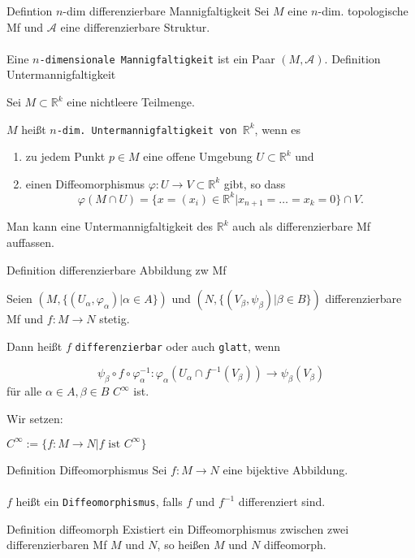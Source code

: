 \documentclass[a6paper,11pt,grid=front]{kartei}
\newcommand{\fl}[1]{\begin{flushleft}
 #1 \end{flushleft}}
\newcommand{\R}{\mathbb{R}}
\begin{document}
\nonameyet
{Defintion} {$n$-dim differenzierbare Mannigfaltigkeit}
{Sei $M$ eine $n$-dim. topologische Mf und $\mathcal{A}$ eine differenzierbare Struktur.
\\
~\\
Eine \texttt{$n$-dimensionale Mannigfaltigkeit} ist ein Paar $(M,\mathcal{A})$.
}
{}
\nonameyet
{Definition} {Untermannigfaltigkeit}
{
Sei $M \subset \R^k$ eine nichtleere Teilmenge.
\\
\fl{$M$ heißt \texttt{$n$-dim. Untermannigfaltigkeit von $\R^k$}, wenn es
}
\begin{enumerate}[1.]
\item zu jedem Punkt $p\in M$ eine offene Umgebung $U \subset \R^k$  und
\item einen Diffeomorphismus $\varphi : U \to V \subset \R^k$ gibt, so dass
\[
\varphi(M \cap U) = \{ x = (x_i) \in \R^k | x_{n+1} = \dots = x_k = 0
\} \cap V.
\]
\end{enumerate}
%
\tiny
Man kann eine Untermannigfaltigkeit des $\R^k$ auch als differenzierbare Mf
auffassen. 
}
{}

\nonameyet
{Definition} {differenzierbare Abbildung zw Mf}
{
Seien $(M,\{(U_\alpha, \varphi_\alpha)| \alpha \in A\})$ 
und $(N,\{(V_\beta, \psi_\beta)| \beta \in B\})$ 
differenzierbare Mf und $f: M\to N$ stetig.
\\
\fl{ Dann heißt $f$ \texttt{differenzierbar} oder auch \texttt{glatt}, wenn}
\[
\psi_\beta \circ f \circ \varphi_\alpha^{-1}:
\varphi_\alpha(U_\alpha \cap f^ {-1}(V_\beta)) \to 
\psi_\beta(V_\beta)
\]
für alle $\alpha\in A,\beta \in B$ $C^\infty$ ist.
\\
\fl{Wir setzen:}
$C^\infty := \{ f: M\to N| f \text{ ist } C^\infty\}$
}
{}

\nonameyet
{Definition} {Diffeomorphismus}
{
Sei $f: M \to N$ eine bijektive Abbildung.
\\
~\\
$f$ heißt ein \texttt{Diffeomorphismus}, falls $f$ und $f^{-1}$ differenziert
sind.
}
{}

\nonameyet
{Definition} {diffeomorph}
{
Existiert ein Diffeomorphismus zwischen zwei differenzierbaren Mf $M$ und $N$,
so heißen $M$ und $N$ diffeomorph.
}
{}


\end{document}
